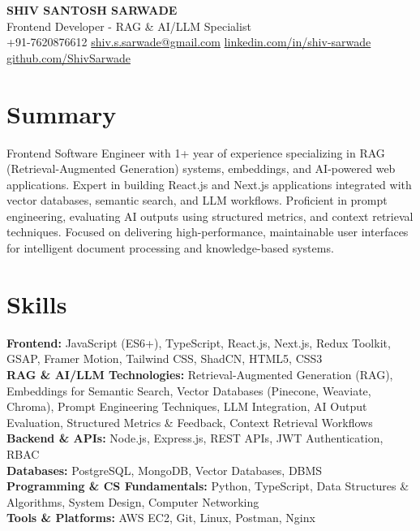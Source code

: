 \documentclass[a4paper,10pt]{article}
\begin{document}
    \pagestyle{empty}

    \begin{center}
        {\LARGE \textbf{SHIV SANTOSH SARWADE}}\\
        Frontend Developer - RAG \& AI/LLM Specialist\\[4pt]
        +91-7620876612 \quad
        \href{mailto:shiv.s.sarwade@gmail.com}{shiv.s.sarwade@gmail.com} \quad
        \href{https://linkedin.com/in/shiv-sarwade}{linkedin.com/in/shiv-sarwade} \quad
        \href{https://github.com/ShivSarwade}{github.com/ShivSarwade}
    \end{center}

    \section*{Summary}

    Frontend Software Engineer with 1+ year of experience specializing in RAG (Retrieval-Augmented Generation) systems, embeddings, and AI-powered web applications. Expert in building React.js and Next.js applications integrated with vector databases, semantic search, and LLM workflows. Proficient in prompt engineering, evaluating AI outputs using structured metrics, and context retrieval techniques. Focused on delivering high-performance, maintainable user interfaces for intelligent document processing and knowledge-based systems.

    \section*{Skills}

    \textbf{Frontend:} JavaScript (ES6+), TypeScript, React.js, Next.js, Redux Toolkit, GSAP, Framer Motion, Tailwind CSS, ShadCN, HTML5, CSS3\\
    \textbf{RAG \& AI/LLM Technologies:} Retrieval-Augmented Generation (RAG), Embeddings for Semantic Search, Vector Databases (Pinecone, Weaviate, Chroma), Prompt Engineering Techniques, LLM Integration, AI Output Evaluation, Structured Metrics \& Feedback, Context Retrieval Workflows\\
    \textbf{Backend \& APIs:} Node.js, Express.js, REST APIs, JWT Authentication, RBAC\\
    \textbf{Databases:} PostgreSQL, MongoDB, Vector Databases, DBMS\\
    \textbf{Programming \& CS Fundamentals:} Python, TypeScript, Data Structures \& Algorithms, System Design, Computer Networking\\
    \textbf{Tools \& Platforms:} AWS EC2, Git, Linux, Postman, Nginx
\end{document}
